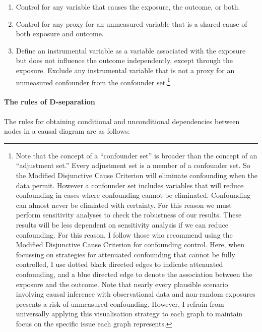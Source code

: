 \documentclass[
  singlecolumn,
  9pt]{article}
\let\oldparagraph\paragraph
\renewcommand{\paragraph}[1]{\oldparagraph{#1}\mbox{}}
\providecommand{\tightlist}{%
  \setlength{\itemsep}{0pt}\setlength{\parskip}{0pt}}\usepackage{longtable,booktabs,array}
\begin{document}
\begin{enumerate}
\def\labelenumi{\alph{enumi}.}
\tightlist
\item
  Control for any variable that causes the exposure, the outcome, or
  both.
\item
  Control for any proxy for an unmeasured variable that is a shared
  cause of both exposure and outcome.
\item
  Define an instrumental variable as a variable associated with the
  exposure but does not influence the outcome independently, except
  through the exposure. Exclude any instrumental variable that is not a
  proxy for an unmeasured confounder from the confounder set.\footnote{Note
    that the concept of a ``confounder set'' is broader than the concept
    of an ``adjustment set.'' Every adjustment set is a member of a
    confounder set. So the Modified Disjunctive Cause Criterion will
    eliminate confounding when the data permit. However a confounder set
    includes variables that will reduce confounding in cases where
    confounding cannot be eliminated. Confounding can almost never be
    elimiated with certainty. For this reason we must perform
    sensitivity analyses to check the robustness of our results. These
    results will be less dependent on sensitivity analysis if we can
    reduce confounding. For this reason, I follow those who recommend
    using the Modified Disjunctive Cause Criterion for confounding
    control. Here, when focussing on strategies for attenuated
    confounding that cannot be fully controlled, I use dotted black
    directed edges to indicate attenuated confounding, and a blue
    directed edge to denote the association between the exposure and the
    outcome. Note that nearly every plausible scenario involving causal
    inference with observational data and non-random exposures presents
    a risk of unmeasured confounding. However, I refrain from
    universally applying this visualisation strategy to each graph to
    maintain focus on the specific issue each graph represents.}
\end{enumerate}

\paragraph{The rules of D-separation}\label{the-rules-of-d-separation}

The rules for obtaining conditional and unconditional dependencies
between nodes in a causal diagram are as follows:
\end{document}
